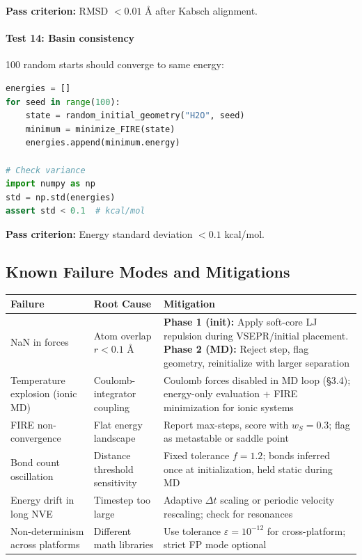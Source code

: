 \documentclass[11pt]{article}
\begin{document}
\textbf{Pass criterion:} RMSD $< 0.01$ Å after Kabsch alignment.

\paragraph{Test 14: Basin consistency}

100 random starts should converge to same energy:

\begin{lstlisting}[language=Python]
energies = []
for seed in range(100):
    state = random_initial_geometry("H2O", seed)
    minimum = minimize_FIRE(state)
    energies.append(minimum.energy)

# Check variance
import numpy as np
std = np.std(energies)
assert std < 0.1  # kcal/mol
\end{lstlisting}

\textbf{Pass criterion:} Energy standard deviation $< 0.1$ kcal/mol.

\subsection{Known Failure Modes and Mitigations}

\begin{center}
\begin{tabular}{p{4cm}p{4cm}p{5cm}}
\toprule
Failure & Root Cause & Mitigation \\
\midrule
NaN in forces & Atom overlap $r < 0.1$ Å & \textbf{Phase 1 (init):} Apply soft-core LJ repulsion during VSEPR/initial placement. \textbf{Phase 2 (MD):} Reject step, flag geometry, reinitialize with larger separation \\
Temperature explosion (ionic MD) & Coulomb-integrator coupling & Coulomb forces disabled in MD loop (§3.4); energy-only evaluation + FIRE minimization for ionic systems \\
FIRE non-convergence & Flat energy landscape & Report max-steps, score with $w_S = 0.3$; flag as metastable or saddle point \\
Bond count oscillation & Distance threshold sensitivity & Fixed tolerance $f = 1.2$; bonds inferred once at initialization, held static during MD \\
Energy drift in long NVE & Timestep too large & Adaptive $\Delta t$ scaling or periodic velocity rescaling; check for resonances \\
Non-determinism across platforms & Different math libraries & Use tolerance $\varepsilon = 10^{-12}$ for cross-platform; strict FP mode optional \\
\bottomrule
\end{tabular}
\end{center}
\end{document}
